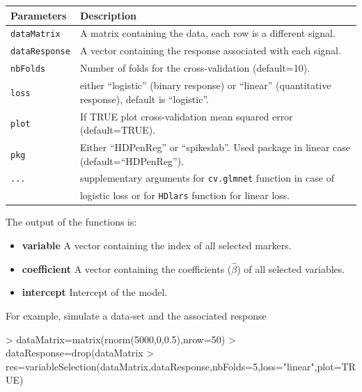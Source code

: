 \documentclass[a4paper,10pt]{article}
\begin{document}
		\begin{center}
			\begin{tabular}{|l|l|}
				\hline
				Parameters & Description\\
				\hline
				\texttt{dataMatrix} & A matrix containing the data, each row is a different signal.\\
				\texttt{dataResponse} & A vector containing the response associated with each signal.\\
				\texttt{nbFolds} & Number of folds for the cross-validation (default=10).\\							
        \texttt{loss}  & either ``logistic'' (binary response) or ``linear'' (quantitative response), default is ``logistic''.\\
				\texttt{plot} & If TRUE plot cross-validation mean squared error (default=TRUE).\\
        \texttt{pkg} & Either ``HDPenReg'' or ``spikeslab''. Used package in linear case (default=``HDPenReg'').\\
				\texttt{...} & supplementary arguments for \texttt{cv.glmnet} function \cite{glmnet} in case of \\
				~ & logistic loss or for \texttt{HDlars} function for linear loss.\\
				\hline	
			\end{tabular}		
		\end{center}

		The output of the functions is:
		
		\begin{itemize}
			\item \textbf{variable} A vector containing the index of all selected markers.
			\item \textbf{coefficient} A vector containing the coefficients ($\hat{\beta}$) of all selected variables.
			\item \textbf{intercept} Intercept of the model.
		\end{itemize}
		
		For example, simulate a data-set and the associated response	
\begin{Schunk}
\begin{Sinput}
> dataMatrix=matrix(rnorm(5000,0,0.5),nrow=50)
> dataResponse=drop(dataMatrix%
> res=variableSelection(dataMatrix,dataResponse,nbFolds=5,loss="linear",plot=TRUE)
\end{Sinput}
\end{Schunk}
\end{document}
